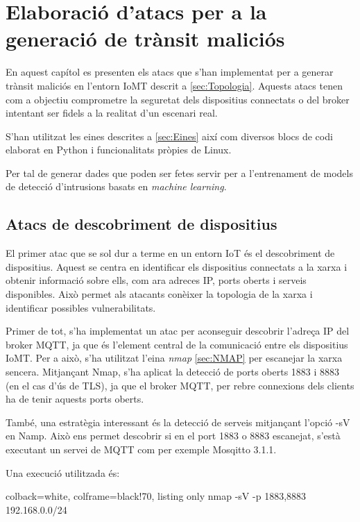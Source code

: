 \chapter{Elaboració d'atacs per a la generació de trànsit maliciós}

En aquest capítol es presenten els atacs que s'han implementat per a generar trànsit maliciós en l'entorn IoMT descrit a \ref{sec:Topologia}. Aquests atacs tenen com a objectiu comprometre la seguretat dels dispositius connectats o del broker intentant ser fidels a la realitat d'un escenari real. 

S'han utilitzat les eines descrites a \ref{sec:Eines} així com diversos blocs de codi elaborat en Python i funcionalitats pròpies de Linux. 


Per tal de generar dades que poden ser fetes servir per a l'entrenament de models de detecció d'intrusions basats en \textit{machine learning}.



\section{Atacs de descobriment de dispositius}
\label{sec:Recon}

El primer atac que se sol dur a terme en un entorn IoT és el descobriment de dispositius. Aquest se centra en identificar els dispositius connectats a la xarxa i obtenir informació sobre ells, com ara adreces IP, ports oberts i serveis disponibles. Això permet als atacants conèixer la topologia de la xarxa i identificar possibles vulnerabilitats.

Primer de tot, s'ha implementat un atac per aconseguir descobrir l'adreça IP del broker MQTT, ja que és l'element central de la comunicació entre els dispositius IoMT. Per a això, s'ha utilitzat l'eina \textit{nmap} \ref{sec:NMAP} per escanejar la xarxa sencera. Mitjançant Nmap, s'ha aplicat la detecció de ports oberts 1883 i 8883 (en el cas d'ús de TLS), ja que el broker MQTT, per rebre connexions dels clients ha de tenir aquests ports oberts.

També, una estratègia interessant és la detecció de serveis mitjançant l'opció -sV en Namp. Això ens permet descobrir si en el port 1883 o 8883 escanejat, s'està executant un servei de MQTT com per exemple Mosqitto 3.1.1.

Una execució utilitzada és:
\begin{tcblisting}{colback=white, colframe=black!70, listing only}
    nmap -sV -p 1883,8883 192.168.0.0/24
\end{tcblisting}

